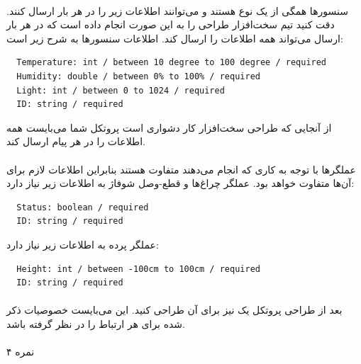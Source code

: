 \documentclass[../main.tex]{subfiles}
\begin{document}
\paragraph{}
سنسورها همگی از یک نوع هستند و می‌توانند اطلاعات زیر را در هر بار ارسال کنند.
دقت کنید تیم سخت‌افزار طراحی را به این صورت انجام داده است که در هر بار ارسال می‌تواند همه اطلاعات را ارسال کند.
اطلاعات سنسورها به شرح زیر است:

\begin{latin}
\begin{lstlisting}
  Temperature: int / between 10 degree to 100 degree / required
  Humidity: double / between 0% to 100% / required
  Light: int / between 0 to 1024 / required
  ID: string / required
\end{lstlisting}
\end{latin}

از آنجایی که طراحی سخت‌افزار کار دشواری است پروتکل شما می‌بایست همه اطلاعات را در هر پیام ارسال کند.

\paragraph{}
عملگرها با توجه به کاری که انجام می‌دهند متفاوت هستند بنابراین اطلاعات لازم برای آن‌ها متفاوت خواهد بود.
عملگر چراغ‌ها و قطع-وصل شوفاژ به اطلاعات زیر نیاز دارد:

\begin{latin}
\begin{lstlisting}
  Status: boolean / required
  ID: string / required
\end{lstlisting}
\end{latin}

عملگر پرده به اطلاعات زیر نیاز دارد:

\begin{latin}
\begin{lstlisting}
  Height: int / between -100cm to 100cm / required
  ID: string / required
\end{lstlisting}
\end{latin}

\paragraph{}
بعد از طراحی پروتکل یک  نیز برای آن طراحی کنید.
این  می‌بایست خصوصیات ذکر شده برای هر ارتباط را در نظر گرفته باشد.

\paragraph{}
۴ نمره

\end{document}
